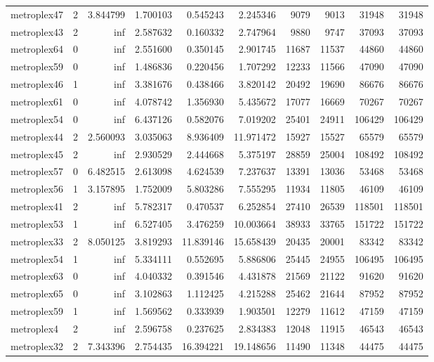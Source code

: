\begin{longtable}{|l|r|r|r|r|r|r|r|r|r|}
metroplex47 & 2 & 3.844799 & 1.700103 & 0.545243 & 2.245346 & 9079 & 9013 & 31948 & 31948 \\
metroplex43 & 2 & inf & 2.587632 & 0.160332 & 2.747964 & 9880 & 9747 & 37093 & 37093 \\
metroplex64 & 0 & inf & 2.551600 & 0.350145 & 2.901745 & 11687 & 11537 & 44860 & 44860 \\
metroplex59 & 0 & inf & 1.486836 & 0.220456 & 1.707292 & 12233 & 11566 & 47090 & 47090 \\
metroplex46 & 1 & inf & 3.381676 & 0.438466 & 3.820142 & 20492 & 19690 & 86676 & 86676 \\
metroplex61 & 0 & inf & 4.078742 & 1.356930 & 5.435672 & 17077 & 16669 & 70267 & 70267 \\
metroplex54 & 0 & inf & 6.437126 & 0.582076 & 7.019202 & 25401 & 24911 & 106429 & 106429 \\
metroplex44 & 2 & 2.560093 & 3.035063 & 8.936409 & 11.971472 & 15927 & 15527 & 65579 & 65579 \\
metroplex45 & 2 & inf & 2.930529 & 2.444668 & 5.375197 & 28859 & 25004 & 108492 & 108492 \\
metroplex57 & 0 & 6.482515 & 2.613098 & 4.624539 & 7.237637 & 13391 & 13036 & 53468 & 53468 \\
metroplex56 & 1 & 3.157895 & 1.752009 & 5.803286 & 7.555295 & 11934 & 11805 & 46109 & 46109 \\
metroplex41 & 2 & inf & 5.782317 & 0.470537 & 6.252854 & 27410 & 26539 & 118501 & 118501 \\
metroplex53 & 1 & inf & 6.527405 & 3.476259 & 10.003664 & 38933 & 33765 & 151722 & 151722 \\
metroplex33 & 2 & 8.050125 & 3.819293 & 11.839146 & 15.658439 & 20435 & 20001 & 83342 & 83342 \\
metroplex54 & 1 & inf & 5.334111 & 0.552695 & 5.886806 & 25445 & 24955 & 106495 & 106495 \\
metroplex63 & 0 & inf & 4.040332 & 0.391546 & 4.431878 & 21569 & 21122 & 91620 & 91620 \\
metroplex65 & 0 & inf & 3.102863 & 1.112425 & 4.215288 & 25462 & 21644 & 87952 & 87952 \\
metroplex59 & 1 & inf & 1.569562 & 0.333939 & 1.903501 & 12279 & 11612 & 47159 & 47159 \\
metroplex4 & 2 & inf & 2.596758 & 0.237625 & 2.834383 & 12048 & 11915 & 46543 & 46543 \\
metroplex32 & 2 & 7.343396 & 2.754435 & 16.394221 & 19.148656 & 11490 & 11348 & 44475 & 44475 \\

\end{longtable}

